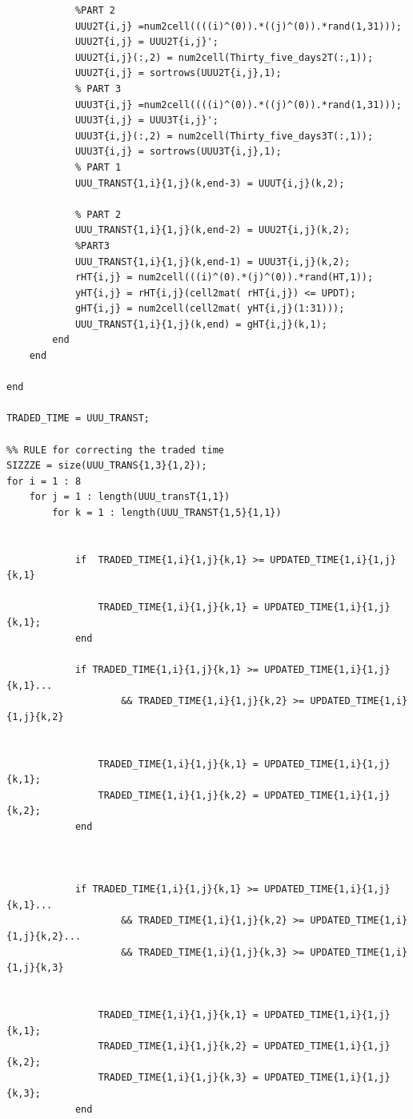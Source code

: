 \documentclass{DissertateUSU}
\begin{document}
\begin{verbatim}
            %PART 2
            UUU2T{i,j} =num2cell((((i)^(0)).*((j)^(0)).*rand(1,31)));
            UUU2T{i,j} = UUU2T{i,j}';
            UUU2T{i,j}(:,2) = num2cell(Thirty_five_days2T(:,1));
            UUU2T{i,j} = sortrows(UUU2T{i,j},1);
            % PART 3
            UUU3T{i,j} =num2cell((((i)^(0)).*((j)^(0)).*rand(1,31)));
            UUU3T{i,j} = UUU3T{i,j}';
            UUU3T{i,j}(:,2) = num2cell(Thirty_five_days3T(:,1));
            UUU3T{i,j} = sortrows(UUU3T{i,j},1);
            % PART 1
            UUU_TRANST{1,i}{1,j}(k,end-3) = UUUT{i,j}(k,2);
            
            % PART 2
            UUU_TRANST{1,i}{1,j}(k,end-2) = UUU2T{i,j}(k,2);
            %PART3
            UUU_TRANST{1,i}{1,j}(k,end-1) = UUU3T{i,j}(k,2);
            rHT{i,j} = num2cell(((i)^(0).*(j)^(0)).*rand(HT,1));
            yHT{i,j} = rHT{i,j}(cell2mat( rHT{i,j}) <= UPDT);
            gHT{i,j} = num2cell(cell2mat( yHT{i,j}(1:31)));
            UUU_TRANST{1,i}{1,j}(k,end) = gHT{i,j}(k,1);
        end
    end
    
end

TRADED_TIME = UUU_TRANST;

%% RULE for correcting the traded time
SIZZZE = size(UUU_TRANS{1,3}{1,2});
for i = 1 : 8
    for j = 1 : length(UUU_transT{1,1})
        for k = 1 : length(UUU_TRANST{1,5}{1,1})
            
            
            if  TRADED_TIME{1,i}{1,j}{k,1} >= UPDATED_TIME{1,i}{1,j}{k,1}
                
                TRADED_TIME{1,i}{1,j}{k,1} = UPDATED_TIME{1,i}{1,j}{k,1};
            end
                
            if TRADED_TIME{1,i}{1,j}{k,1} >= UPDATED_TIME{1,i}{1,j}{k,1}...
                    && TRADED_TIME{1,i}{1,j}{k,2} >= UPDATED_TIME{1,i}{1,j}{k,2}
                
                
                TRADED_TIME{1,i}{1,j}{k,1} = UPDATED_TIME{1,i}{1,j}{k,1};
                TRADED_TIME{1,i}{1,j}{k,2} = UPDATED_TIME{1,i}{1,j}{k,2};
            end
                
                
                
            if TRADED_TIME{1,i}{1,j}{k,1} >= UPDATED_TIME{1,i}{1,j}{k,1}...
                    && TRADED_TIME{1,i}{1,j}{k,2} >= UPDATED_TIME{1,i}{1,j}{k,2}...
                    && TRADED_TIME{1,i}{1,j}{k,3} >= UPDATED_TIME{1,i}{1,j}{k,3}
                
                
                TRADED_TIME{1,i}{1,j}{k,1} = UPDATED_TIME{1,i}{1,j}{k,1};
                TRADED_TIME{1,i}{1,j}{k,2} = UPDATED_TIME{1,i}{1,j}{k,2};
                TRADED_TIME{1,i}{1,j}{k,3} = UPDATED_TIME{1,i}{1,j}{k,3};
            end
                

\end{verbatim}
\end{document}
